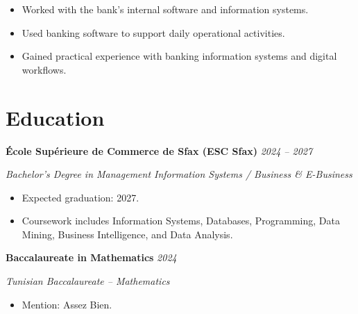 \documentclass[a4paper,10pt]{article}
\begin{document}
\begin{itemize}[
    leftmargin=*,
    noitemsep,
    topsep=0pt,
    partopsep=0pt,
    parsep=0pt
]

    \item Worked with the bank's internal software and information systems.
    
    \item Used banking software to support daily operational activities.
    
    \item Gained practical experience with banking information systems and digital workflows.

\end{itemize}



\section*{Education}

\noindent
\textbf{École Supérieure de Commerce de Sfax (ESC Sfax)}
\hfill
\textit{2024 -- 2027}


\textit{Bachelor's Degree in Management Information Systems / Business \& E-Business}

\begin{itemize}[
    leftmargin=*,
    noitemsep,
    topsep=0pt,
    partopsep=0pt,
    parsep=0pt
]

    \item Expected graduation: 2027.

    \item Coursework includes Information Systems, Databases, Programming, Data Mining, Business Intelligence, and Data Analysis.

\end{itemize}


\noindent
\textbf{Baccalaureate in Mathematics}
\hfill
\textit{2024}


\textit{Tunisian Baccalaureate -- Mathematics}

\begin{itemize}[
    leftmargin=*,
    noitemsep,
    topsep=0pt,
    partopsep=0pt,
    parsep=0pt
]

    \item Mention: Assez Bien.

\end{itemize}
\end{document}
